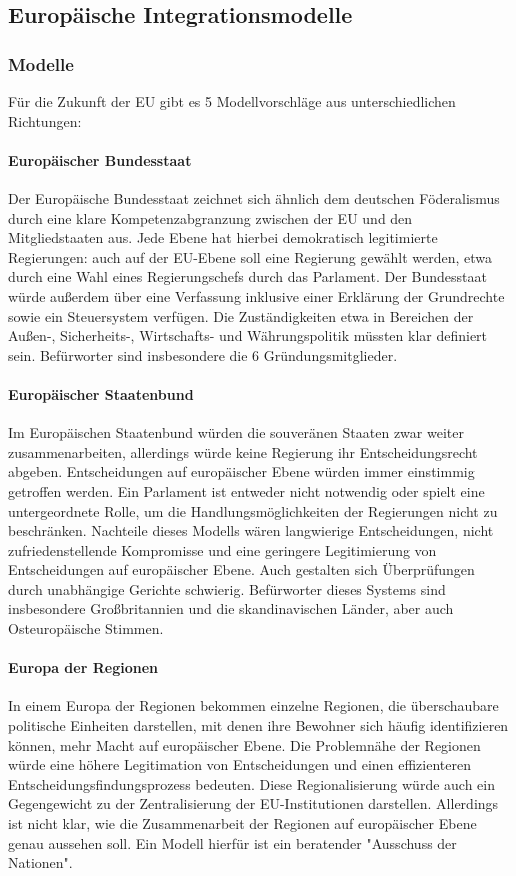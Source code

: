 \documentclass{article}
\begin{document}
	\subsection{Europäische Integrationsmodelle}
	\subsubsection{Modelle}
	Für die Zukunft der EU gibt es 5 Modellvorschläge aus unterschiedlichen Richtungen:

	\paragraph{Europäischer Bundesstaat}
	Der Europäische Bundesstaat zeichnet sich ähnlich dem deutschen Föderalismus durch eine klare Kompetenzabgranzung zwischen der EU und den Mitgliedstaaten aus. Jede Ebene hat hierbei demokratisch legitimierte Regierungen: auch auf der EU-Ebene soll eine Regierung gewählt werden, etwa durch eine Wahl eines Regierungschefs durch das Parlament. Der Bundesstaat würde außerdem über eine Verfassung inklusive einer Erklärung der Grundrechte sowie ein Steuersystem verfügen. Die Zuständigkeiten etwa in Bereichen der Außen-, Sicherheits-, Wirtschafts- und Währungspolitik müssten klar definiert sein. Befürworter sind insbesondere die 6 Gründungsmitglieder.

	\paragraph{Europäischer Staatenbund}
	Im Europäischen Staatenbund würden die souveränen Staaten zwar weiter zusammenarbeiten, allerdings würde keine Regierung ihr Entscheidungsrecht abgeben. Entscheidungen auf europäischer Ebene würden immer einstimmig getroffen werden. Ein Parlament ist entweder nicht notwendig oder spielt eine untergeordnete Rolle, um die Handlungsmöglichkeiten der Regierungen nicht zu beschränken. Nachteile dieses Modells wären langwierige Entscheidungen, nicht zufriedenstellende Kompromisse und eine geringere Legitimierung von Entscheidungen auf europäischer Ebene. Auch gestalten sich Überprüfungen durch unabhängige Gerichte schwierig. Befürworter dieses Systems sind insbesondere Großbritannien und die skandinavischen Länder, aber auch Osteuropäische Stimmen.

	\paragraph{Europa der Regionen}
	In einem Europa der Regionen bekommen einzelne Regionen, die überschaubare politische Einheiten darstellen, mit denen  ihre Bewohner sich häufig identifizieren können, mehr Macht auf europäischer Ebene. Die Problemnähe der Regionen würde eine höhere Legitimation von Entscheidungen und einen effizienteren Entscheidungsfindungsprozess bedeuten. Diese Regionalisierung würde auch ein Gegengewicht zu der Zentralisierung der EU-Institutionen darstellen. Allerdings ist nicht klar, wie die Zusammenarbeit der Regionen auf europäischer Ebene genau aussehen soll. Ein Modell hierfür ist ein beratender "Ausschuss der Nationen". 
\end{document}
